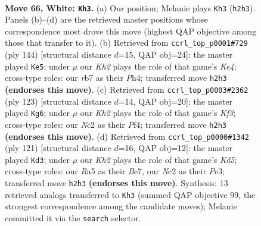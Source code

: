 \documentclass[11pt]{article}
\begin{document}
\clearpage

\begin{figure}[p]\centering
\begin{subfigure}{0.46\textwidth}\centering
\resizebox{\linewidth}{!}{%
\newchessgame
\chessboard[
  setfen={7k/1r4b1/6R1/R7/2P5/8/2N4K/8 w - - 52 66},
  showmover=false,
  pgfstyle=straightmove, color=movearrow, markmove={h2-h3}
]}
\caption{}
\end{subfigure}\hfill
\begin{subfigure}{0.46\textwidth}\centering
\resizebox{\linewidth}{!}{%
\newchessgame
\chessboard[
  setfen={8/3k4/4bR2/7p/4K2P/8/8/8 w - - 1 73},
  showmover=false,
  pgfstyle=straightmove, color=movearrow, markmove={e4-e5}
]}
\caption{}
\end{subfigure}
\\[4pt]
\begin{subfigure}{0.46\textwidth}\centering
\resizebox{\linewidth}{!}{%
\newchessgame
\chessboard[
  setfen={R7/8/5k2/8/5p2/Br6/8/K7 b - - 6 62},
  showmover=false,
  pgfstyle=straightmove, color=movearrow, markmove={f6-g6}
]}
\caption{}
\end{subfigure}\hfill
\begin{subfigure}{0.46\textwidth}\centering
\resizebox{\linewidth}{!}{%
\newchessgame
\chessboard[
  setfen={7r/4b3/6K1/7B/3k4/4p3/2R5/8 b - - 3 61},
  showmover=false,
  pgfstyle=straightmove, color=movearrow, markmove={d4-d3}
]}
\caption{}
\end{subfigure}
\caption{\textbf{Move 66, White: \texttt{Kh3}.} (a) Our position; Melanie plays \texttt{Kh3} (\texttt{h2h3}). Panels (b)--(d) are the retrieved master positions whose correspondence most drove this move (highest QAP objective among those that transfer to it). (b) Retrieved from \texttt{ccrl\_top\_p0001\#729} (ply 144) [structural distance $d$=15, QAP obj=24]: the master played \texttt{Ke5}; under $\mu$ our \emph{Kh2} plays the role of that game's \emph{Ke4}; cross-type roles: our \emph{r}b7 as their \emph{P}h4; transferred move \texttt{h2h3} \textbf{(endorses this move)}. (c) Retrieved from \texttt{ccrl\_top\_p0003\#2362} (ply 123) [structural distance $d$=14, QAP obj=20]: the master played \texttt{Kg6}; under $\mu$ our \emph{Kh2} plays the role of that game's \emph{Kf3}; cross-type roles: our \emph{N}c2 as their \emph{P}f4; transferred move \texttt{h2h3} \textbf{(endorses this move)}. (d) Retrieved from \texttt{ccrl\_top\_p0000\#1342} (ply 121) [structural distance $d$=16, QAP obj=12]: the master played \texttt{Kd3}; under $\mu$ our \emph{Kh2} plays the role of that game's \emph{Kd5}; cross-type roles: our \emph{R}a5 as their \emph{B}e7, our \emph{N}c2 as their \emph{P}e3; transferred move \texttt{h2h3} \textbf{(endorses this move)}. Synthesis: 13 retrieved analogs transferred to \texttt{Kh3} (summed QAP objective 99, the strongest correspondence among the candidate moves); Melanie committed it via the \texttt{search} selector.}
\label{fig:thought-m130}
\end{figure}
\end{document}
